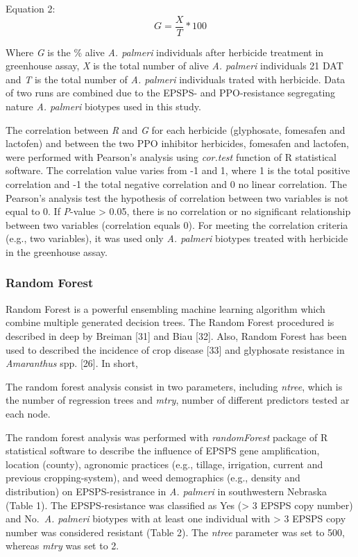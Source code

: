 \documentclass[10pt,letterpaper]{article}
\begin{document}
Equation 2: \[G=\frac{X}{T} * 100 \]

Where \emph{G} is the \% alive \emph{A. palmeri} individuals after
herbicide treatment in greenhouse assay, \emph{X} is the total number of
alive \emph{A. palmeri} individuals 21 DAT and \emph{T} is the total
number of \emph{A. palmeri} individuals trated with herbicide. Data of
two runs are combined due to the EPSPS- and PPO-resistance segregating
nature \emph{A. palmeri} biotypes used in this study.

The correlation between \emph{R} and \emph{G} for each herbicide
(glyphosate, fomesafen and lactofen) and between the two PPO inhibitor
herbicides, fomesafen and lactofen, were performed with Pearson's
analysis using \emph{cor.test} function of R statistical software. The
correlation value varies from -1 and 1, where 1 is the total positive
correlation and -1 the total negative correlation and 0 no linear
correlation. The Pearson's analysis test the hypothesis of correlation
between two variables is not equal to 0. If \emph{P}-value
\textgreater{} 0.05, there is no correlation or no significant
relationship between two variables (correlation equals 0). For meeting
the correlation criteria (e.g., two variables), it was used only
\emph{A. palmeri} biotypes treated with herbicide in the greenhouse
assay.

\hypertarget{random-forest}{%
\subsubsection{Random Forest}\label{random-forest}}

Random Forest is a powerful ensembling machine learning algorithm which
combine multiple generated decision trees. The Random Forest procedured
is described in deep by Breiman {[}31{]} and Biau {[}32{]}. Also, Random
Forest has been used to described the incidence of crop disease {[}33{]}
and glyphosate resistance in \emph{Amaranthus} spp. {[}26{]}. In short,

The random forest analysis consist in two parameters, including
\emph{ntree}, which is the number of regression trees and \emph{mtry},
number of different predictors tested ar each node.

The random forest analysis was performed with \emph{randomForest}
package of R statistical software to describe the influence of EPSPS
gene amplification, location (county), agronomic practices (e.g.,
tillage, irrigation, current and previous cropping-system), and weed
demographics (e.g., density and distribution) on EPSPS-resistrance in
\emph{A. palmeri} in southwestern Nebraska (Table 1). The
EPSPS-resistance was classified as Yes (\textgreater{} 3 EPSPS copy
number) and No.~\emph{A. palmeri} biotypes with at least one individual
with \textgreater{} 3 EPSPS copy number was considered resistant (Table
2). The \emph{ntree} parameter was set to 500, whereas \emph{mtry} was
set to 2.
\end{document}
